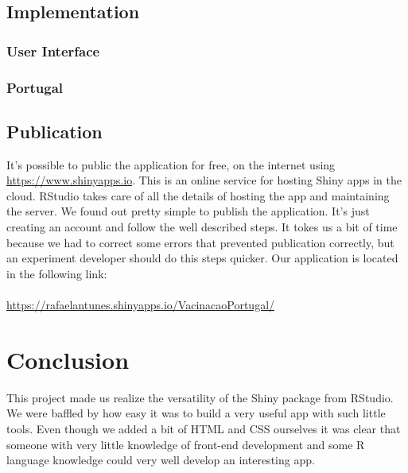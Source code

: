\documentclass[11pt,a4paper]{report}
\begin{document}
\section{Implementation}

\subsection{User Interface}


\subsection{Portugal}




\section{Publication}
It's possible to public the application for free, on the internet using \url{https://www.shinyapps.io}. \cite{io} This is an online service for hosting Shiny apps in the cloud. RStudio takes care of all the details of hosting the app and maintaining the server.
We found out pretty simple to publish the application. It's just creating an account and follow the well described steps. It tokes us a bit of time because we had to correct some errors that prevented publication correctly, but an experiment developer should do this steps quicker. Our application is located in the following link:\\
\\
\href{https://rafaelantunes.shinyapps.io/VacinacaoPortugal/}{https://rafaelantunes.shinyapps.io/VacinacaoPortugal/}

\chapter{Conclusion}

This project made us realize the versatility of the Shiny package from RStudio. We were baffled by how easy it was to build a very useful app with such little tools. Even though we added a bit of HTML and CSS ourselves it was clear that someone with very little knowledge of front-end development and some R language knowledge could very well develop an interesting app.
\end{document}
